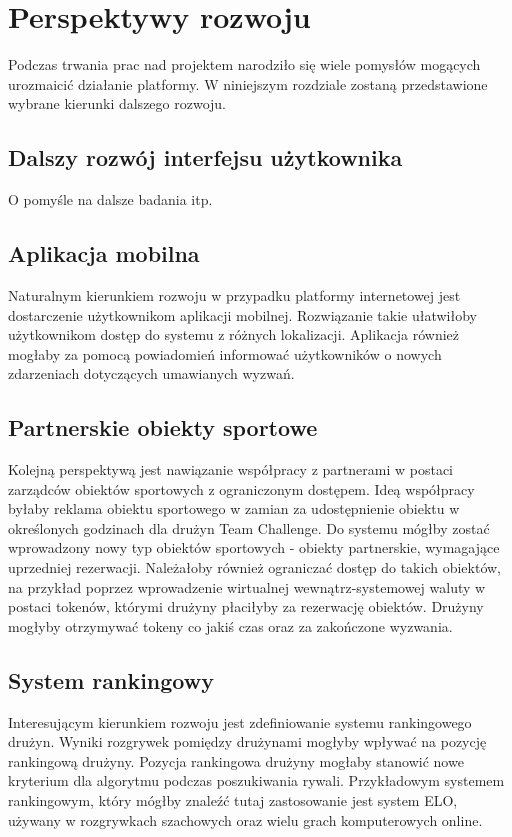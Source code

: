 \chapter{Perspektywy rozwoju}

Podczas trwania prac nad projektem narodziło się wiele pomysłów mogących urozmaicić działanie platformy. W niniejszym rozdziale zostaną przedstawione wybrane kierunki dalszego rozwoju.

\section{Dalszy rozwój interfejsu użytkownika}

O pomyśle na dalsze badania itp.

\section{Aplikacja mobilna}

Naturalnym kierunkiem rozwoju w przypadku platformy internetowej jest dostarczenie użytkownikom aplikacji mobilnej. Rozwiązanie takie ułatwiłoby użytkownikom dostęp do systemu z różnych lokalizacji. Aplikacja również mogłaby za pomocą powiadomień informować użytkowników o nowych zdarzeniach dotyczących umawianych wyzwań.

\section{Partnerskie obiekty sportowe}

Kolejną perspektywą jest nawiązanie współpracy z partnerami w postaci zarządców obiektów sportowych z ograniczonym dostępem. Ideą współpracy byłaby reklama obiektu sportowego w zamian za udostępnienie obiektu w określonych godzinach dla drużyn Team Challenge. Do systemu mógłby zostać wprowadzony nowy typ obiektów sportowych - obiekty partnerskie, wymagające uprzedniej rezerwacji. Należałoby również ograniczać dostęp do takich obiektów, na przykład poprzez wprowadzenie wirtualnej wewnątrz-systemowej waluty w postaci tokenów, którymi drużyny płaciłyby za rezerwację obiektów. Drużyny mogłyby otrzymywać tokeny co jakiś czas oraz za zakończone wyzwania.

\section{System rankingowy}

Interesującym kierunkiem rozwoju jest zdefiniowanie systemu rankingowego drużyn. Wyniki rozgrywek pomiędzy drużynami mogłyby wpływać na pozycję rankingową drużyny. Pozycja rankingowa drużyny mogłaby stanowić nowe kryterium dla algorytmu podczas poszukiwania rywali. Przykładowym systemem rankingowym, który mógłby znaleźć tutaj zastosowanie jest system ELO, używany w rozgrywkach szachowych oraz wielu grach komputerowych online.

\begin{comment}

proponowanei spotkan przez zawodnikow
propozycje pobliskich obiektow przy negocjacjach miejsca
system notyfikacji

\end{comment}
